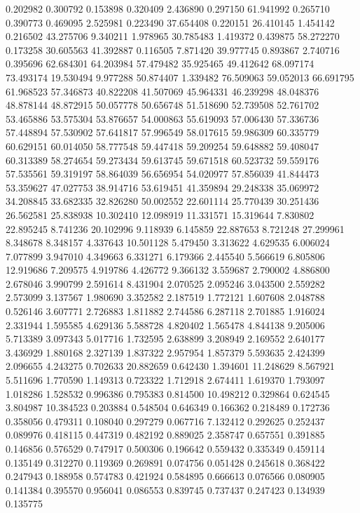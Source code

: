 0.202982
0.300792
0.153898
0.320409
2.436890
0.297150
61.941992
0.265710
0.390773
0.469095
2.525981
0.223490
37.654408
0.220151
26.410145
1.454142
0.216502
43.275706
9.340211
1.978965
30.785483
1.419372
0.439875
58.272270
0.173258
30.605563
41.392887
0.116505
7.871420
39.977745
0.893867
2.740716
0.395696
62.684301
64.203984
57.479482
35.925465
49.412642
68.097174
73.493174
19.530494
9.977288
50.874407
1.339482
76.509063
59.052013
66.691795
61.968523
57.346873
40.822208
41.507069
45.964331
46.239298
48.048376
48.878144
48.872915
50.057778
50.656748
51.518690
52.739508
52.761702
53.465886
53.575304
53.876657
54.000863
55.619093
57.006430
57.336736
57.448894
57.530902
57.641817
57.996549
58.017615
59.986309
60.335779
60.629151
60.014050
58.777548
59.447418
59.209254
59.648882
59.408047
60.313389
58.274654
59.273434
59.613745
59.671518
60.523732
59.559176
57.535561
59.319197
58.864039
56.656954
54.020977
57.856039
41.844473
53.359627
47.027753
38.914716
53.619451
41.359894
29.248338
35.069972
34.208845
33.682335
32.826280
50.002552
22.601114
25.770439
30.251436
26.562581
25.838938
10.302410
12.098919
11.331571
15.319644
7.830802
22.895245
8.741236
20.102996
9.118939
6.145859
22.887653
8.721248
27.299961
8.348678
8.348157
4.337643
10.501128
5.479450
3.313622
4.629535
6.006024
7.077899
3.947010
4.349663
6.331271
6.179366
2.445540
5.566619
6.805806
12.919686
7.209575
4.919786
4.426772
9.366132
3.559687
2.790002
4.886800
2.678046
3.990799
2.591614
8.431904
2.070525
2.095246
3.043500
2.559282
2.573099
3.137567
1.980690
3.352582
2.187519
1.772121
1.607608
2.048788
0.526146
3.607771
2.726883
1.811882
2.744586
6.287118
2.701885
1.916024
2.331944
1.595585
4.629136
5.588728
4.820402
1.565478
4.844138
9.205006
5.713389
3.097343
5.017716
1.732595
2.638899
3.208949
2.169552
2.640177
3.436929
1.880168
2.327139
1.837322
2.957954
1.857379
5.593635
2.424399
2.096655
4.243275
0.702633
20.882659
0.642430
1.394601
11.248629
8.567921
5.511696
1.770590
1.149313
0.723322
1.712918
2.674411
1.619370
1.793097
1.018286
1.528532
0.996386
0.795383
0.814500
10.498212
0.329864
0.624545
3.804987
10.384523
0.203884
0.548504
0.646349
0.166362
0.218489
0.172736
0.358056
0.479311
0.108040
0.297279
0.067716
7.132412
0.292625
0.252437
0.089976
0.418115
0.447319
0.482192
0.889025
2.358747
0.657551
0.391885
0.146856
0.576529
0.747917
0.500306
0.196642
0.559432
0.335349
0.459114
0.135149
0.312270
0.119369
0.269891
0.074756
0.051428
0.245618
0.368422
0.247943
0.188958
0.574783
0.421924
0.584895
0.666613
0.076566
0.080905
0.141384
0.395570
0.956041
0.086553
0.839745
0.737437
0.247423
0.134939
0.135775
